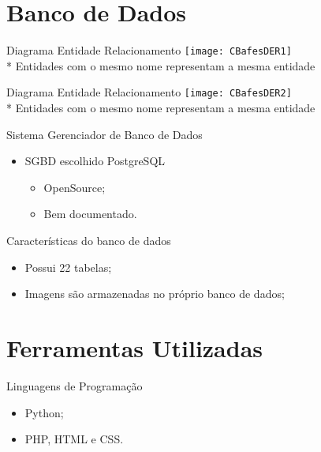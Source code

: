 \documentclass{beamer}
\begin{document}
  \section{Banco de Dados}
  \begin{frame}{Diagrama Entidade Relacionamento}
    \texttt{[image: CBafesDER1]}
    \\ * Entidades com o mesmo nome representam a mesma entidade
  \end{frame}
  \begin{frame}{Diagrama Entidade Relacionamento}
    \texttt{[image: CBafesDER2]}
    \\ * Entidades com o mesmo nome representam a mesma entidade
  \end{frame}
  \begin{frame}{Sistema Gerenciador de Banco de Dados}
    \begin{itemize}
        \item SGBD escolhido PostgreSQL
        \begin{itemize}
            \item OpenSource;
            \item Bem documentado.
        \end{itemize}
    \end{itemize}
  \end{frame}
  \begin{frame}{Caracter\'isticas do banco de dados}
        \begin{itemize}
            \item Possui 22 tabelas;
            \item Imagens s\~ao armazenadas no pr\'oprio banco de dados;
        \end{itemize}
  \end{frame}
  
  \section{Ferramentas Utilizadas}
  \begin{frame}{Linguagens de Programa\c{c}\~ao}
        \begin{itemize}
            \item Python;
            \item PHP, HTML e CSS.
        \end{itemize}
  \end{frame}
  
\end{document}
